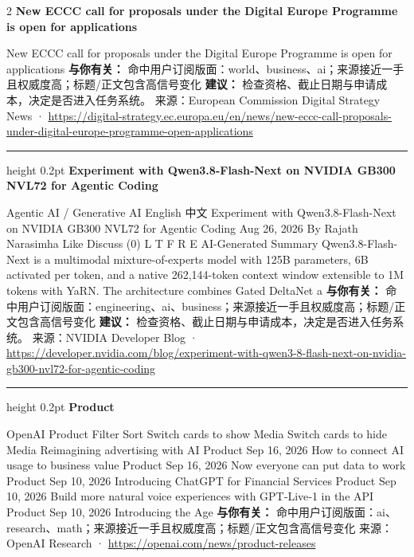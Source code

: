 \documentclass[10.5pt]{ctexart}
\begin{document}
\begin{multicols}{2}
{\large\bfseries New ECCC call for proposals under the Digital Europe Programme is open for applications}\par
New ECCC call for proposals under the Digital Europe Programme is open for applications
\textbf{与你有关：} 命中用户订阅版面：world、business、ai；来源接近一手且权威度高；标题/正文包含高信号变化
\textbf{建议：} 检查资格、截止日期与申请成本，决定是否进入任务系统。
{\footnotesize\color{ormuted} 来源：European Commission Digital Strategy News · \url{https://digital-strategy.ec.europa.eu/en/news/new-eccc-call-proposals-under-digital-europe-programme-open-applications}}
\vspace{2mm}
\hrule height 0.2pt
\vspace{2mm}
{\large\bfseries Experiment with Qwen3.8-Flash-Next on NVIDIA GB300 NVL72 for Agentic Coding}\par
Agentic AI / Generative AI English 中文 Experiment with Qwen3.8-Flash-Next on NVIDIA GB300 NVL72 for Agentic Coding Aug 26, 2026 By Rajath Narasimha Like Discuss (0) L T F R E AI-Generated Summary Qwen3.8-Flash-Next is a multimodal mixture-of-experts model with 125B parameters, 6B activated per token, and a native 262,144-token context window extensible to 1M tokens with YaRN. The architecture combines Gated DeltaNet a
\textbf{与你有关：} 命中用户订阅版面：engineering、ai、business；来源接近一手且权威度高；标题/正文包含高信号变化
\textbf{建议：} 检查资格、截止日期与申请成本，决定是否进入任务系统。
{\footnotesize\color{ormuted} 来源：NVIDIA Developer Blog · \url{https://developer.nvidia.com/blog/experiment-with-qwen3-8-flash-next-on-nvidia-gb300-nvl72-for-agentic-coding}}
\vspace{2mm}
\hrule height 0.2pt
\vspace{2mm}
{\large\bfseries Product}\par
OpenAI Product Filter Sort Switch cards to show Media Switch cards to hide Media Reimagining advertising with AI Product Sep 16, 2026 How to connect AI usage to business value Product Sep 16, 2026 Now everyone can put data to work Product Sep 10, 2026 Introducing ChatGPT for Financial Services Product Sep 10, 2026 Build more natural voice experiences with GPT‑Live‑1 in the API Product Sep 10, 2026 Introducing the Age
\textbf{与你有关：} 命中用户订阅版面：ai、research、math；来源接近一手且权威度高；标题/正文包含高信号变化
{\footnotesize\color{ormuted} 来源：OpenAI Research · \url{https://openai.com/news/product-releases}}
\vspace{2mm}

\end{multicols}
\end{document}
